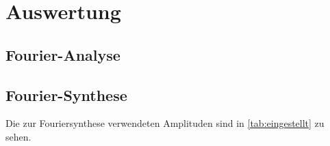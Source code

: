 \section{Auswertung}
\label{sec:Auswertung}

\subsection{Fourier-Analyse}


\subsection{Fourier-Synthese}
Die zur Fouriersynthese verwendeten Amplituden sind in \autoref{tab:eingestellt} zu sehen. 

